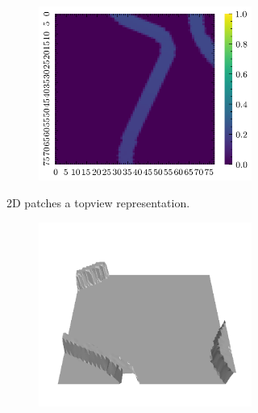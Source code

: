 \documentclass[../document.tex]{subfiles}
\begin{document}
\begin{figure} [htbp]
\begin{subfigure}[b]{1\textwidth}
\begin{subfigure}[b]{0.24\textwidth}
    \includegraphics[width=\linewidth]{../img/bars1-example-patches/2d/14.png}    
    \end{subfigure}  
\caption{2D patches a topview representation.}
\end{subfigure}  
\begin{subfigure}[b]{1\textwidth}
    \begin{subfigure}[b]{0.24\textwidth}
    \includegraphics[width=\linewidth]{../img/bars1-example-patches/3d/2.png}    
    \end{subfigure}  

\end{subfigure}
\end{figure}
\end{document}
